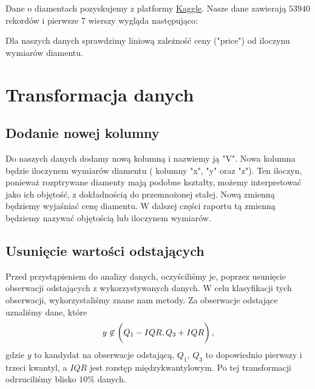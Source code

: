 \documentclass[12pt]{article}
\theoremstyle{exer}
\begin{document}
	Dane o diamentach pozyskujemy z platformy \href{https://www.kaggle.com}{Kaggle}. Nasze dane zawierają $53940$ rekordów i pierwsze $7$ wierszy wygląda następująco:
	\begin{table}[H]
		\caption{Oryginalne dane.}
		\label{orginalne_dane}
	\end{table}
	
	Dla naszych danych sprawdzimy liniową zależność ceny ("price") od iloczynu wymiarów diamentu.
	\section{Transformacja danych}
	
	\subsection{Dodanie nowej kolumny }
	Do naszych danych dodamy nową kolumną i nazwiemy ją "V". Nowa kolumna będzie iloczynem wymiarów diamentu ( kolumny "x", "y" oraz "z"). Ten iloczyn, ponieważ rozptrywane diamenty mają podobne kształty, możemy interpretować jako ich objętość, z dokładnością do przemnożonej stałej. Nową zmienną będziemy wyjaśniać cenę diamentu. W dalszej części raportu tą zmienną będziemy nazywać objętością lub iloczynem wymiarów.
	
	\subsection{Usunięcie wartości odstających}
	Przed przystąpieniem do analizy danych, oczyściliśmy je, poprzez usunięcie obserwacji odstających z wykorzystywanych danych. W celu klasyfikacji tych obserwacji, wykorzystaliśmy znane nam metody. Za obserwacje odstające uznaliśmy dane, które
	\begin{equation}
		y\not\in\left(\vphantom{\frac{1}{1}}Q_1-IQR,Q_3+IQR\right),
	\end{equation}
	gdzie $y$ to kandydat na obserwacje odstającą, $Q_1$, $Q_3$ to dopowiednio pierwszy i trzeci kwantyl, a $IQR$ jest rozstęp międzykwantylowym. Po tej transformacji odrzuciliśmy blisko $10\%$ danych.
\end{document}
